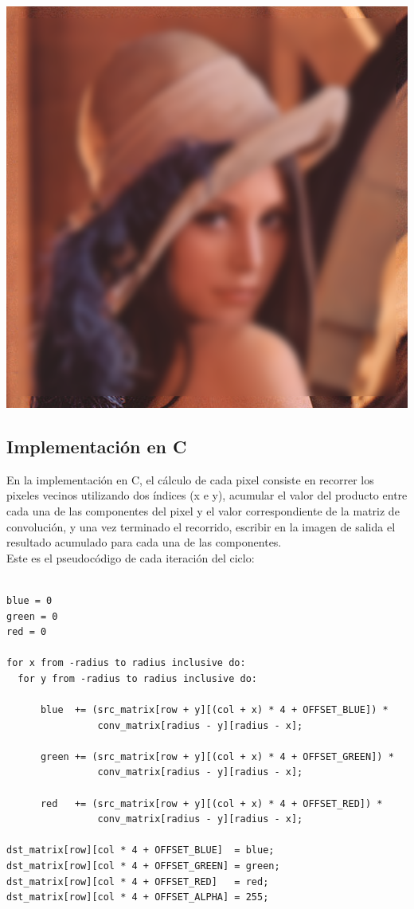 \documentclass[10pt,a4paper,spanish]{article}
\begin{document}
\includegraphics[keepaspectratio]{blur_lena24_5_15.png}

\subsection{Implementación en C}

En la implementación en C, el cálculo de cada pixel consiste en recorrer los pixeles vecinos utilizando dos índices (x e y), acumular el valor del producto entre cada una de las componentes del pixel y el valor correspondiente de la matriz de convolución, y una vez terminado el recorrido, escribir en la imagen de salida el resultado acumulado para cada una de las componentes. \\

Este es el pseudocódigo de cada iteración del ciclo:

\begin{codesnippet}
\begin{verbatim}

blue = 0
green = 0
red = 0

for x from -radius to radius inclusive do:
  for y from -radius to radius inclusive do:

      blue  += (src_matrix[row + y][(col + x) * 4 + OFFSET_BLUE]) *
                conv_matrix[radius - y][radius - x];

      green += (src_matrix[row + y][(col + x) * 4 + OFFSET_GREEN]) *
                conv_matrix[radius - y][radius - x];

      red   += (src_matrix[row + y][(col + x) * 4 + OFFSET_RED]) *
                conv_matrix[radius - y][radius - x];

dst_matrix[row][col * 4 + OFFSET_BLUE]  = blue;
dst_matrix[row][col * 4 + OFFSET_GREEN] = green;
dst_matrix[row][col * 4 + OFFSET_RED]   = red;
dst_matrix[row][col * 4 + OFFSET_ALPHA] = 255;

\end{verbatim}
\end{codesnippet}
\end{document}
